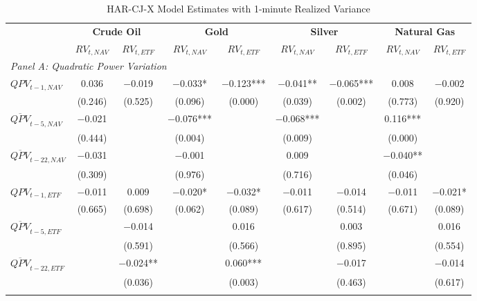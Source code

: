\begin{landscape}
\begin{table}[htbp]
\centering
\caption{HAR-CJ-X Model Estimates with 1-minute Realized Variance}
\label{tab:HAR_CJ_1min}
\begin{threeparttable}
\footnotesize
\begin{tabular}{@{}lcccccccc@{}}
\toprule
 & \multicolumn{2}{c}{\textbf{Crude Oil}} & \multicolumn{2}{c}{\textbf{Gold}} & \multicolumn{2}{c}{\textbf{Silver}} & \multicolumn{2}{c}{\textbf{Natural Gas}} \\
\cmidrule(lr){2-3} \cmidrule(lr){4-5} \cmidrule(lr){6-7} \cmidrule(lr){8-9}
 & $RV_{t,NAV}$ & $RV_{t,ETF}$ & $RV_{t,NAV}$ & $RV_{t,ETF}$ & $RV_{t,NAV}$ & $RV_{t,ETF}$ & $RV_{t,NAV}$ & $RV_{t,ETF}$ \\
\midrule
\multicolumn{9}{l}{\textit{Panel A: Quadratic Power Variation}} \\
\addlinespace[0.1cm]
$QPV_{t-1,NAV}$ & 0.036 & $-$0.019 & $-$0.033* & $-$0.123*** & $-$0.041** & $-$0.065*** & 0.008 & $-$0.002 \\
                & (0.246) & (0.525) & (0.096) & (0.000) & (0.039) & (0.002) & (0.773) & (0.920) \\
\addlinespace[0.05cm]
$\overline{QPV}_{t-5,NAV}$ & $-$0.021 &  & $-$0.076*** &  & $-$0.068*** &  & 0.116*** &  \\
                          & (0.444) &  & (0.004) &  & (0.009) &  & (0.000) &  \\
\addlinespace[0.05cm]
$\overline{QPV}_{t-22,NAV}$ & $-$0.031 &  & $-$0.001 &  & 0.009 &  & $-$0.040** &  \\
                           & (0.309) &  & (0.976) &  & (0.716) &  & (0.046) &  \\
\addlinespace[0.05cm]
$QPV_{t-1,ETF}$ & $-$0.011 & 0.009 & $-$0.020* & $-$0.032* & $-$0.011 & $-$0.014 & $-$0.011 & $-$0.021* \\
                & (0.665) & (0.698) & (0.062) & (0.089) & (0.617) & (0.514) & (0.671) & (0.089) \\
\addlinespace[0.05cm]
$\overline{QPV}_{t-5,ETF}$ &  & $-$0.014 &  & 0.016 &  & 0.003 &  & 0.016 \\
                          &  & (0.591) &  & (0.566) &  & (0.895) &  & (0.554) \\
\addlinespace[0.05cm]
$\overline{QPV}_{t-22,ETF}$ &  & $-$0.024** &  & 0.060*** &  & $-$0.017 &  & $-$0.014 \\
                           &  & (0.036) &  & (0.003) &  & (0.463) &  & (0.617) \\
\addlinespace[0.2cm]


\end{tabular}
\end{threeparttable}
\end{table}
\end{landscape}
